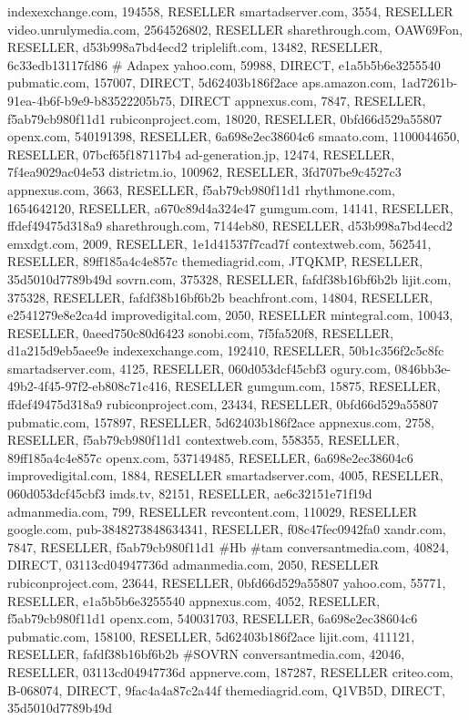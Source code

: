 indexexchange.com, 194558, RESELLER
smartadserver.com, 3554, RESELLER
video.unrulymedia.com, 2564526802, RESELLER
sharethrough.com, OAW69Fon, RESELLER, d53b998a7bd4ecd2
triplelift.com, 13482, RESELLER, 6c33edb13117fd86
# Adapex
yahoo.com, 59988, DIRECT, e1a5b5b6e3255540
pubmatic.com, 157007, DIRECT, 5d62403b186f2ace
aps.amazon.com, 1ad7261b-91ea-4b6f-b9e9-b83522205b75, DIRECT
appnexus.com, 7847, RESELLER, f5ab79cb980f11d1
rubiconproject.com, 18020, RESELLER, 0bfd66d529a55807
openx.com, 540191398, RESELLER, 6a698e2ec38604c6
smaato.com, 1100044650, RESELLER, 07bcf65f187117b4
ad-generation.jp, 12474, RESELLER, 7f4ea9029ac04e53
districtm.io, 100962, RESELLER, 3fd707be9c4527c3
appnexus.com, 3663, RESELLER, f5ab79cb980f11d1
rhythmone.com, 1654642120, RESELLER, a670c89d4a324e47
gumgum.com, 14141, RESELLER, ffdef49475d318a9
sharethrough.com, 7144eb80, RESELLER, d53b998a7bd4ecd2
emxdgt.com, 2009, RESELLER, 1e1d41537f7cad7f
contextweb.com, 562541, RESELLER, 89ff185a4c4e857c
themediagrid.com, JTQKMP, RESELLER, 35d5010d7789b49d
sovrn.com, 375328, RESELLER, fafdf38b16bf6b2b
lijit.com, 375328, RESELLER, fafdf38b16bf6b2b
beachfront.com, 14804, RESELLER, e2541279e8e2ca4d
improvedigital.com, 2050, RESELLER
mintegral.com, 10043, RESELLER, 0aeed750c80d6423
sonobi.com, 7f5fa520f8, RESELLER, d1a215d9eb5aee9e
indexexchange.com, 192410, RESELLER, 50b1c356f2c5c8fc
smartadserver.com, 4125, RESELLER, 060d053dcf45cbf3
ogury.com, 0846bb3e-49b2-4f45-97f2-eb808c71c416, RESELLER
gumgum.com, 15875, RESELLER, ffdef49475d318a9
rubiconproject.com, 23434, RESELLER, 0bfd66d529a55807
pubmatic.com, 157897, RESELLER, 5d62403b186f2ace
appnexus.com, 2758, RESELLER, f5ab79cb980f11d1
contextweb.com, 558355, RESELLER, 89ff185a4c4e857c
openx.com, 537149485, RESELLER, 6a698e2ec38604c6
improvedigital.com, 1884, RESELLER
smartadserver.com, 4005, RESELLER, 060d053dcf45cbf3
imds.tv, 82151, RESELLER, ae6c32151e71f19d
admanmedia.com, 799, RESELLER
revcontent.com, 110029, RESELLER
google.com, pub-3848273848634341, RESELLER, f08c47fec0942fa0
xandr.com, 7847, RESELLER, f5ab79cb980f11d1 #Hb #tam
conversantmedia.com, 40824, DIRECT, 03113cd04947736d
admanmedia.com, 2050, RESELLER
rubiconproject.com, 23644, RESELLER, 0bfd66d529a55807
yahoo.com, 55771, RESELLER, e1a5b5b6e3255540
appnexus.com, 4052, RESELLER, f5ab79cb980f11d1
openx.com, 540031703, RESELLER, 6a698e2ec38604c6
pubmatic.com, 158100, RESELLER, 5d62403b186f2ace
lijit.com, 411121, RESELLER, fafdf38b16bf6b2b #SOVRN
conversantmedia.com, 42046, RESELLER, 03113cd04947736d
appnerve.com, 187287, RESELLER
criteo.com, B-068074, DIRECT, 9fac4a4a87c2a44f
themediagrid.com, Q1VB5D, DIRECT, 35d5010d7789b49d
